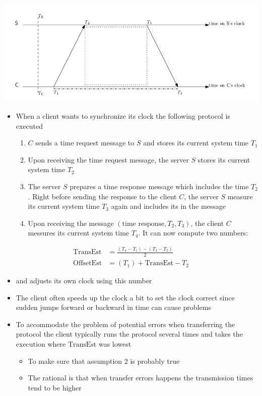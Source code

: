 \documentclass[11pt]{article}
\begin{document}
\begin{center}
\includegraphics[width=.9\linewidth]{Synchronous Agreement (7)/screenshot_2018-09-23_08-58-10.png}
\end{center}
\begin{itemize}
\item When a client wants to synchronize its clock the following protocol is executed
\begin{enumerate}
\item \(C\) sends a time request message to \(S\) and stores its current system time \(T_1\)
\item Upon receiving the time request message, the server \(S\) stores its current system time \(T_2\)
\item The server \(S\) prepares a time response message which includes the time \(T_2\). Right before sending the response to the client \(C\), the server \(S\) measure its current system time \(T_3\) again and includes its in the message
\item Upon receiving the message \((\text{time response}, T_2,T_3)\), the client \(C\) messures its current system time \(T_4\). It can now compute two numbers:
\end{enumerate}
\end{itemize}
\begin{equation}
  \begin{split} 
    \text{TransEst} &= \frac{(T_4-T_1)-(T_3-T_2)}2 \\
   \text{OffsetEst} &= (T_1) + \text{TransEst} - T_2
  \end{split}
\end{equation}
\begin{itemize}
\item and adjusts its own clock using this number

\item The client often speeds up the clock a bit to set the clock correct since sudden jumps forward or backward in time can cause problems

\item To accommodate the problem of potential errors when transferring the protocol the client typically runs the protocol several times and takes the execution where \(\text{TransEst}\) was lowest
\begin{itemize}
\item To make sure that assumption 2 is probably true
\item The rational is that when transfer errors happens the transmission times tend to be higher
\end{itemize}
\end{itemize}
\end{document}
